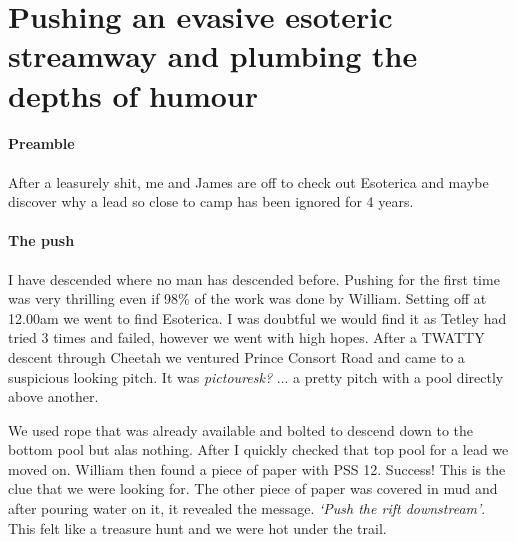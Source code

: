 \begin{marginfigure}
\end{marginfigure}

\section{Pushing an evasive esoteric streamway and plumbing the depths of humour}

\paragraph{Preamble}
After a leasurely shit, me and James are off to check out Esoterica and maybe discover why a lead so close to camp has been ignored for 4 years.
\paragraph{The push} I have descended where no man has descended before. Pushing for the first time was very thrilling even if 98$\%$ of the work was done by William. 
Setting off at 12.00am we went to find Esoterica. I was doubtful we would find it as Tetley had tried 3 times and failed, however we went with high hopes.
After a TWATTY descent through Cheetah we ventured Prince Consort Road and came to a suspicious looking pitch. It was \textit{pictouresk?} ...  a pretty pitch with a pool directly above another.

We used rope that was already available and bolted to descend down to the bottom pool but alas nothing. After I quickly checked that top pool for a lead we moved on. William then found a piece of paper with PSS 12. Success! This is the clue that we were looking for. The other piece of paper was covered in mud and after pouring water on it, it revealed the message.  \textit{‘Push the rift downstream’}. This felt like a treasure hunt and we were hot under the trail.

